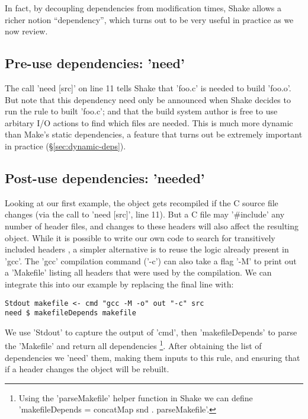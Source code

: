 In fact, by decoupling dependencies from modification times, Shake allows
a richer notion ``dependency'', which turns out to be very useful in practice
as we now review.

\subsection{Pre-use dependencies: \lst'need'\label{sec:need}}

The call \lst'need [src]' on line 11 tells Shake that \lst'foo.c' is needed
to build \lst'foo.o'. But note that this dependency need only be announced
when Shake decides to run the rule to built \lst'foo.c'; and that the
build system author is free to use arbitary I/O actions to find which files
are needed. This is much more dynamic than Make's static dependencies,
a feature that turns out be extremely important in practice (\S\ref{sec:dynamic-deps}).

\subsection{Post-use dependencies: \lst'needed'\label{sec:needed}}

Looking at our first example, the object gets recompiled if the C source file
changes (via the call to \lst'need [src]', line 11).
But a C file may \lst'#include' any number of header files, and changes
to these headers will also affect the resulting object. While it is possible to
write our own code to search for transitively included headers
\cite[\S6.4]{shake}, a simpler alternative is to reuse the logic already present
in \lst'gcc'. The \lst'gcc' compilation command (\lst'-c') can also take a flag
\lst'-M' to print out a \lst'Makefile' listing all headers that were used by the
compilation. We can integrate this into our example by replacing the final
line with:

\begin{lstlisting}
Stdout makefile <- cmd "gcc -M -o" out "-c" src
need $ makefileDepends makefile
\end{lstlisting}

\noindent We use \lst'Stdout' to capture the output of \lst'cmd', then
\lst'makefileDepends' to parse the \lst'Makefile' and return all dependencies
\footnote{Using the \lst'parseMakefile' helper function in Shake we can define
\lst'makefileDepends = concatMap snd . parseMakefile'.}. After obtaining the
list of dependencies we \lst'need' them, making them inputs to this rule, and
ensuring that if a header changes the object will be rebuilt.


